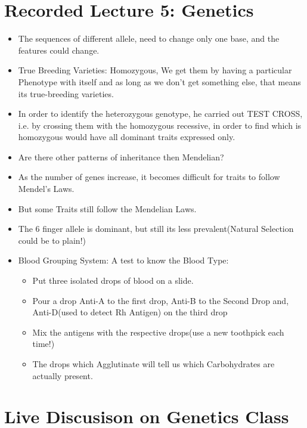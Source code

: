 \documentclass{article}
\begin{document}
\section{Recorded Lecture 5: Genetics}
\begin{itemize}
  \item The sequences of different allele, need to change only one base, and the features could change.
  \item True Breeding Varieties: Homozygous, We get them by having a particular Phenotype with itself and as long as we don't get something else, that means its true-breeding varieties.
  \item In order to identify the heterozygous genotype, he carried out TEST CROSS, i.e. by crossing them with the homozygous recessive, in order to find which is homozygous would have all dominant traits expressed only.
  \item Are there other patterns of inheritance then Mendelian?
  \item As the number of genes increase, it becomes difficult for traits to follow Mendel's Laws.
  \item But some Traits still follow the Mendelian Laws.
  \item The 6 finger allele is dominant, but still its less prevalent(Natural Selection could be to plain!)
  \item Blood Grouping System: A test to know the Blood Type:
  \begin{itemize}
    \item Put three isolated drops of blood on a slide.
    \item Pour a drop Anti-A to the first drop, Anti-B to the Second Drop and, Anti-D(used to detect Rh Antigen) on the third drop
    \item Mix the antigens with the respective drops(use a new toothpick each time!)
    \item The drops which Agglutinate will tell us which Carbohydrates are actually present.
  \end{itemize}
\end{itemize}

\section{Live Discusison on Genetics Class}
\end{document}
